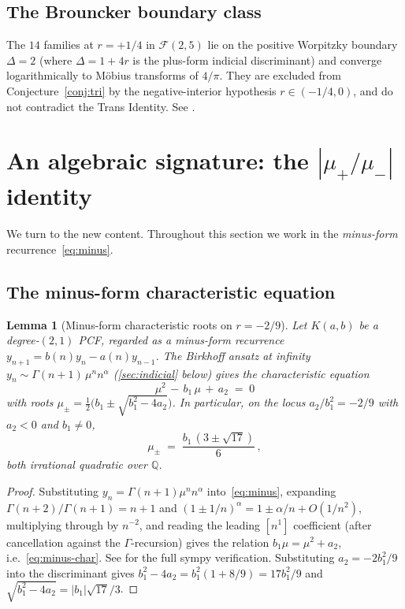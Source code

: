 \documentclass[11pt]{amsart}
\newtheorem{lemma}[theorem]{Lemma}
\theoremstyle{definition}
\theoremstyle{remark}
\newcommand{\FF}{\mathcal{F}}
\newcommand{\Q}{\mathbb{Q}}
\begin{document}
\subsection{The Brouncker boundary class}

The $14$ families at $r = +1/4$ in $\FF(2,5)$ lie on the positive
Worpitzky boundary $\Delta = 2$ (where $\Delta = 1+4r$ is the
plus-form indicial discriminant) and converge logarithmically
to M\"obius transforms of $4/\pi$.  They are excluded from
Conjecture~\ref{conj:tri} by the negative-interior hypothesis
$r\in(-1/4,0)$, and do not contradict the Trans Identity.  See
\cite[Theorem~4.1]{TRINote}.

\section{An algebraic signature: the
\texorpdfstring{$|\mu_+/\mu_-|$}{|mu+/mu-|} identity}
\label{sec:signature}

We turn to the new content.  Throughout this section we work in the
\emph{minus-form} recurrence~\eqref{eq:minus}.

\subsection{The minus-form characteristic equation}

\begin{lemma}[Minus-form characteristic roots on $r=-2/9$]
\label{lem:minus-roots}
Let $K(a,b)$ be a degree-$(2,1)$ PCF, regarded as a minus-form
recurrence $y_{n+1} = b(n)y_n - a(n)y_{n-1}$.  The Birkhoff ansatz at
infinity $y_n \sim \Gamma(n+1)\,\mu^n n^\alpha$
(\textsection\ref{sec:indicial} below) gives the characteristic
equation
\begin{equation}\label{eq:minus-char}
  \mu^2 \,-\, b_1\,\mu \,+\, a_2 \;=\; 0
\end{equation}
with roots $\mu_\pm = \tfrac{1}{2}\bigl(b_1 \pm \sqrt{b_1^2 - 4
a_2}\bigr)$.  In particular, on the locus $a_2/b_1^2 = -2/9$ with
$a_2 < 0$ and $b_1 \ne 0$,
\[
  \mu_\pm \;=\; \frac{b_1\,(3 \pm \sqrt{17})}{6}\,,
\]
both irrational quadratic over $\Q$.
\end{lemma}
\begin{proof}
Substituting $y_n = \Gamma(n+1)\mu^n n^\alpha$ into~\eqref{eq:minus},
expanding $\Gamma(n+2)/\Gamma(n+1) = n+1$ and $(1\pm 1/n)^\alpha
= 1\pm\alpha/n + O(1/n^2)$, multiplying through by $n^{-2}$, and
reading the leading $[n^1]$ coefficient (after cancellation against
the $\Gamma$-recursion) gives the relation $b_1\mu = \mu^2 + a_2$,
i.e.~\eqref{eq:minus-char}.  See \cite[]{SprintW1Report}
for the full sympy verification.  Substituting $a_2 = -2b_1^2/9$ into
the discriminant gives $b_1^2 - 4 a_2 = b_1^2(1 + 8/9) = 17 b_1^2/9$
and $\sqrt{b_1^2-4a_2} = |b_1|\sqrt{17}/3$.
\end{proof}
\end{document}
